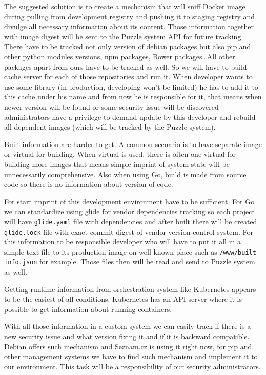 The suggested solution is to create a mechanism that will sniff Docker image during pulling from development registry and pushing it to staging registry and divulge all necessary information about its content. Those information together with image digest will be sent to the Puzzle system API for future tracking. There have to be tracked not only version of debian packages but also pip and other python modules versions, npm packages, Bower \cite{bower} packages\ldots All other packages apart from ours have to be tracked as well. So we will have to build cache server for each of those repositories and run it. When developer wants to use some library (in production, developing won’t be limited) he has to add it to this cache under his name and from now he is responsible for it, that means when newer version will be found or some security issue will be discovered administrators have a privilege to demand update by this developer and rebuild all dependent images (which will be tracked by the Puzzle system).

Built information are harder to get. A common scenario is to have separate image or virtual for building. When virtual is used, there is often one virtual for building more images that means simple imprint of system state will be unnecessarily comprehensive. Also when using Go, build is made from source code so there is no information about version of code.

For start imprint of this development environment have to be sufficient. For Go we can standardize using glide \cite{glide} for vendor dependencies tracking so each project will have \lstinline{glide.yaml} file with dependencies and after built there will be created \lstinline{glide.lock} file with exact commit digest of vendor version control system. For this information to be responsible developer who will have to put it all in a simple text file to its production image on well-known place such as \lstinline{/www/built-info.json} for example. Those files then will be read and send to Puzzle system as well.

Getting runtime information from orchestration system like Kubernetes appears to be the easiest of all conditions. Kubernetes has an API server where it is possible to get information about running containers.

With all those information in a custom system we can easily track if there is a new security issue and what version fixing it and if it is backward compatible. Debian offers such mechanism and Seznam.cz is using it right now, for pip and other management systems we have to find such mechanism and implement it to our environment. This task will be a responsibility of our security administrators.

